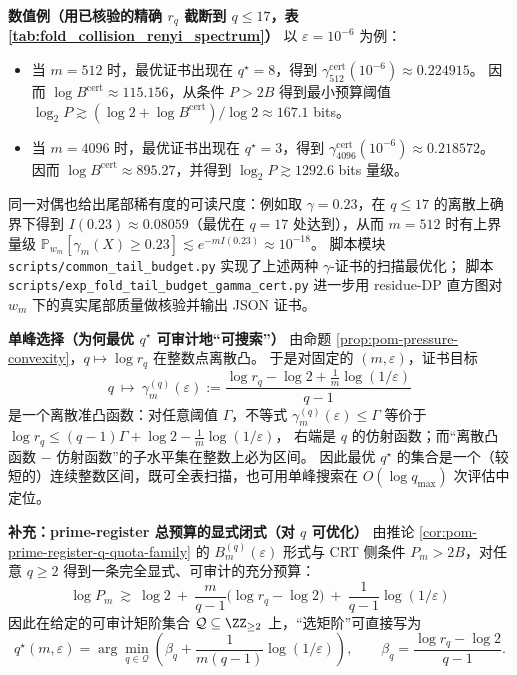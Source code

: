 \begin{remark}
\medskip\noindent\textbf{数值例（用已核验的精确 \texorpdfstring{$r_q$}{rq} 截断到 \(q\le 17\)，表 \ref{tab:fold_collision_renyi_spectrum}）}
以 \(\varepsilon=10^{-6}\) 为例：
\begin{itemize}
  \item 当 \(m=512\) 时，最优证书出现在 \(q^\star=8\)，得到 \(\gamma^{\mathrm{cert}}_{512}(10^{-6})\approx 0.224915\)。
  因而 \(\log B^{\mathrm{cert}}\approx 115.156\)，从条件 \(P>2B\) 得到最小预算阈值
  \(\log_2 P\gtrsim (\log 2+\log B^{\mathrm{cert}})/\log 2\approx 167.1\) bits。
  \item 当 \(m=4096\) 时，最优证书出现在 \(q^\star=3\)，得到 \(\gamma^{\mathrm{cert}}_{4096}(10^{-6})\approx 0.218572\)。
  因而 \(\log B^{\mathrm{cert}}\approx 895.27\)，并得到 \(\log_2 P\gtrsim 1292.6\) bits 量级。
\end{itemize}
同一对偶也给出尾部稀有度的可读尺度：例如取 \(\gamma=0.23\)，在 \(q\le 17\) 的离散上确界下得到
\(I(0.23)\approx 0.08059\)（最优在 \(q=17\) 处达到），从而 \(m=512\) 时有上界量级
\(\mathbb{P}_{w_m}[\gamma_m(X)\ge 0.23]\lesssim e^{-m I(0.23)}\approx 10^{-18}\)。
脚本模块 \texttt{scripts/common\_tail\_budget.py} 实现了上述两种 \(\gamma\)-证书的扫描最优化；
脚本 \texttt{scripts/exp\_fold\_tail\_budget\_gamma\_cert.py} 进一步用 residue-DP 直方图对 \(w_m\) 下的真实尾部质量做核验并输出 JSON 证书。
\par
\medskip\noindent\textbf{单峰选择（为何最优 \(q^\star\) 可审计地“可搜索”）}
由命题 \ref{prop:pom-pressure-convexity}，\(q\mapsto \log r_q\) 在整数点离散凸。
于是对固定的 \((m,\varepsilon)\)，证书目标
\[
q\ \longmapsto\ \gamma^{(q)}_{m}(\varepsilon)
:=\frac{\log r_q-\log 2+\frac{1}{m}\log(1/\varepsilon)}{q-1}
\]
是一个离散准凸函数：对任意阈值 \(\Gamma\)，不等式 \(\gamma^{(q)}_m(\varepsilon)\le \Gamma\) 等价于
\(
\log r_q \le (q-1)\Gamma+\log 2-\frac{1}{m}\log(1/\varepsilon)
\)，
右端是 \(q\) 的仿射函数；而“离散凸函数 \(-\) 仿射函数”的子水平集在整数上必为区间。
因此最优 \(q^\star\) 的集合是一个（较短的）连续整数区间，既可全表扫描，也可用单峰搜索在 \(O(\log q_{\max})\) 次评估中定位。

\medskip\noindent\textbf{补充：prime-register 总预算的显式闭式（对 \(q\) 可优化）}
由推论 \ref{cor:pom-prime-register-q-quota-family} 的 \(B_m^{(q)}(\varepsilon)\) 形式与 CRT 侧条件 \(P_m>2B\)，对任意 \(q\ge 2\) 得到一条完全显式、可审计的充分预算：
\[
\boxed{\;
\log P_m\ \gtrsim\ \log 2\ +\ \frac{m}{q-1}\bigl(\log r_q-\log 2\bigr)\ +\ \frac{1}{q-1}\log(1/\varepsilon)\;}
\]
因此在给定的可审计矩阶集合 \(\mathcal{Q}\subseteq\ZZ_{\ge 2}\) 上，“选矩阶”可直接写为
\[
q^\star(m,\varepsilon)=\arg\min_{q\in\mathcal{Q}}\left(\beta_q+\frac{1}{m(q-1)}\log(1/\varepsilon)\right),
\qquad
\beta_q=\frac{\log r_q-\log 2}{q-1}.
\]


\end{remark}
